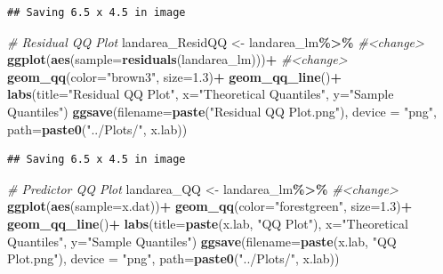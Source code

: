 \documentclass[
]{article}
\newenvironment{Shaded}{\begin{snugshade}}{\end{snugshade}}
\newcommand{\AttributeTok}[1]{\textcolor[rgb]{0.13,0.29,0.53}{#1}}
\newcommand{\CommentTok}[1]{\textcolor[rgb]{0.56,0.35,0.01}{\textit{#1}}}
\newcommand{\FloatTok}[1]{\textcolor[rgb]{0.00,0.00,0.81}{#1}}
\newcommand{\FunctionTok}[1]{\textcolor[rgb]{0.13,0.29,0.53}{\textbf{#1}}}
\newcommand{\NormalTok}[1]{#1}
\newcommand{\OtherTok}[1]{\textcolor[rgb]{0.56,0.35,0.01}{#1}}
\newcommand{\SpecialCharTok}[1]{\textcolor[rgb]{0.81,0.36,0.00}{\textbf{#1}}}
\newcommand{\StringTok}[1]{\textcolor[rgb]{0.31,0.60,0.02}{#1}}
\begin{document}
\begin{verbatim}
## Saving 6.5 x 4.5 in image
\end{verbatim}

\begin{Shaded}
\begin{Highlighting}[]
\CommentTok{\# Residual QQ Plot}
\NormalTok{landarea\_ResidQQ }\OtherTok{\textless{}{-}}\NormalTok{ landarea\_lm}\SpecialCharTok{\%\textgreater{}\%} \CommentTok{\#\textless{}change\textgreater{}}
  \FunctionTok{ggplot}\NormalTok{(}\FunctionTok{aes}\NormalTok{(}\AttributeTok{sample=}\FunctionTok{residuals}\NormalTok{(landarea\_lm)))}\SpecialCharTok{+} \CommentTok{\#\textless{}change\textgreater{}}
  \FunctionTok{geom\_qq}\NormalTok{(}\AttributeTok{color=}\StringTok{"brown3"}\NormalTok{, }\AttributeTok{size=}\FloatTok{1.3}\NormalTok{)}\SpecialCharTok{+}
  \FunctionTok{geom\_qq\_line}\NormalTok{()}\SpecialCharTok{+}
  \FunctionTok{labs}\NormalTok{(}\AttributeTok{title=}\StringTok{"Residual QQ Plot"}\NormalTok{,}
       \AttributeTok{x=}\StringTok{"Theoretical Quantiles"}\NormalTok{,}
       \AttributeTok{y=}\StringTok{"Sample Quantiles"}\NormalTok{)}
\FunctionTok{ggsave}\NormalTok{(}\AttributeTok{filename=}\FunctionTok{paste}\NormalTok{(}\StringTok{"Residual QQ Plot.png"}\NormalTok{), }\AttributeTok{device =} \StringTok{"png"}\NormalTok{, }\AttributeTok{path=}\FunctionTok{paste0}\NormalTok{(}\StringTok{"../Plots/"}\NormalTok{, x.lab))}
\end{Highlighting}
\end{Shaded}

\begin{verbatim}
## Saving 6.5 x 4.5 in image
\end{verbatim}

\begin{Shaded}
\begin{Highlighting}[]
\CommentTok{\# Predictor QQ Plot}
\NormalTok{landarea\_QQ }\OtherTok{\textless{}{-}}\NormalTok{ landarea\_lm}\SpecialCharTok{\%\textgreater{}\%} \CommentTok{\#\textless{}change\textgreater{}}
  \FunctionTok{ggplot}\NormalTok{(}\FunctionTok{aes}\NormalTok{(}\AttributeTok{sample=}\NormalTok{x.dat))}\SpecialCharTok{+}
  \FunctionTok{geom\_qq}\NormalTok{(}\AttributeTok{color=}\StringTok{"forestgreen"}\NormalTok{, }\AttributeTok{size=}\FloatTok{1.3}\NormalTok{)}\SpecialCharTok{+}
  \FunctionTok{geom\_qq\_line}\NormalTok{()}\SpecialCharTok{+}
  \FunctionTok{labs}\NormalTok{(}\AttributeTok{title=}\FunctionTok{paste}\NormalTok{(x.lab, }\StringTok{"QQ Plot"}\NormalTok{),}
       \AttributeTok{x=}\StringTok{"Theoretical Quantiles"}\NormalTok{,}
       \AttributeTok{y=}\StringTok{"Sample Quantiles"}\NormalTok{)}
\FunctionTok{ggsave}\NormalTok{(}\AttributeTok{filename=}\FunctionTok{paste}\NormalTok{(x.lab, }\StringTok{"QQ Plot.png"}\NormalTok{), }\AttributeTok{device =} \StringTok{"png"}\NormalTok{, }\AttributeTok{path=}\FunctionTok{paste0}\NormalTok{(}\StringTok{"../Plots/"}\NormalTok{, x.lab))}
\end{Highlighting}
\end{Shaded}
\end{document}
